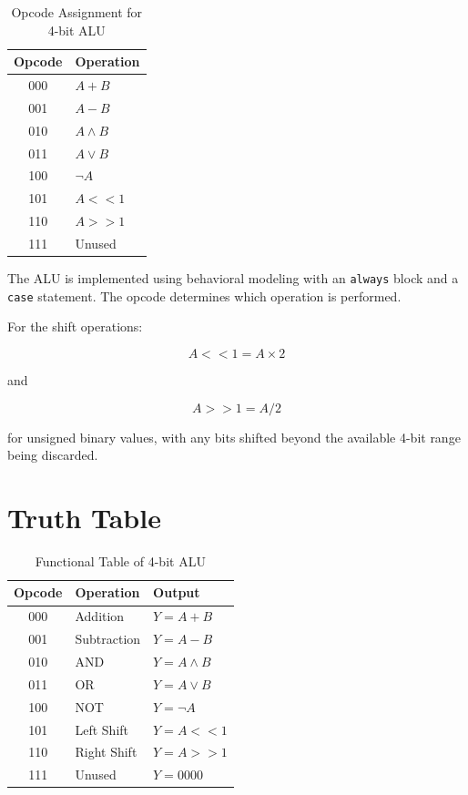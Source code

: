 \documentclass[12pt,a4paper]{report}
\begin{document}
\begin{table}[H]
    \centering
    \caption{Opcode Assignment for 4-bit ALU}
    \label{tab:alu_opcode}
    \begin{tabular}{|c|l|}
    \hline
    \textbf{Opcode} & \textbf{Operation} \\
    \hline
    000 & $A + B$ \\
    \hline
    001 & $A - B$ \\
    \hline
    010 & $A \land B$ \\
    \hline
    011 & $A \lor B$ \\
    \hline
    100 & $\lnot A$ \\
    \hline
    101 & $A << 1$ \\
    \hline
    110 & $A >> 1$ \\
    \hline
    111 & Unused \\
    \hline
    \end{tabular}
\end{table}

The ALU is implemented using behavioral modeling with an \texttt{always} block and a \texttt{case} statement. The opcode determines which operation is performed.

For the shift operations:

\[
A << 1 = A \times 2
\]

and

\[
A >> 1 = A/2
\]

for unsigned binary values, with any bits shifted beyond the available 4-bit range being discarded.

\section{Truth Table}

\begin{table}[H]
    \centering
    \caption{Functional Table of 4-bit ALU}
    \label{tab:alu_truth}
    \begin{tabular}{|c|l|l|}
    \hline
    \textbf{Opcode} & \textbf{Operation} & \textbf{Output} \\
    \hline
    000 & Addition & $Y=A+B$ \\
    \hline
    001 & Subtraction & $Y=A-B$ \\
    \hline
    010 & AND & $Y=A\land B$ \\
    \hline
    011 & OR & $Y=A\lor B$ \\
    \hline
    100 & NOT & $Y=\lnot A$ \\
    \hline
    101 & Left Shift & $Y=A<<1$ \\
    \hline
    110 & Right Shift & $Y=A>>1$ \\
    \hline
    111 & Unused & $Y=0000$ \\
    \hline
    \end{tabular}
\end{table}
\end{document}
